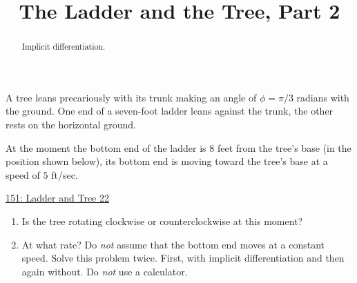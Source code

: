 \documentclass{ximera}
\title{The Ladder and the Tree, Part 2}
\begin{document}
\begin{abstract}
Implicit differentiation.
\end{abstract}
\maketitle


\begin{question}  \label{Qvgggbbhhhggg}
A tree leans precariously with its trunk making an angle of $\phi = \pi/3$ radians with the ground. One end of a seven-foot ladder leans against the trunk, the other rests on the horizontal ground.

At the moment the bottom end of the ladder is $8$ feet from the tree's base (in the position shown below), its bottom end is moving toward the tree's base at a speed of $5$ ft/sec.

 
\begin{onlineOnly}
   \begin{center}
\end{center}
\end{onlineOnly}

\href{https://www.desmos.com/calculator/oftz4vb9qj}{151: Ladder and Tree 22}

\begin{enumerate}
\item Is the tree rotating clockwise or counterclockwise at this moment?

\item At what rate? Do \emph{not} assume that the bottom end moves at a constant speed. Solve this problem twice. First, with implicit differentiation and then again without. Do \emph{not} use a calculator. 
\end{enumerate}


\end{question}
\end{document}
